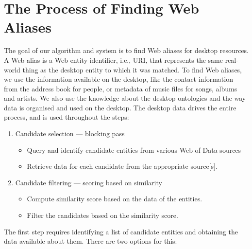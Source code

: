 \section{The Process of Finding Web Aliases}
\label{sec:process}

The goal of our algorithm and system is to find Web aliases for desktop resources. A Web alias is a Web entity identifier, i.e., URI, that represents the same real-world thing as the desktop entity to which it was matched. To find Web aliases, we use the information available on the desktop, like the contact information from the address book for people, or metadata of music files for songs, albums and artists. We also use the knowledge about the desktop ontologies and the way data is organised and used on the desktop. The desktop data drives the entire process, and is used throughout the steps:

\begin{enumerate}
 \item Candidate selection --- blocking pass
 \begin{itemize}
  \item Query and identify candidate entities from various Web of Data sources
  \item Retrieve data for each candidate from the appropriate source[s].
 \end{itemize}
 \item Candidate filtering --- scoring based on similarity
 \begin{itemize}
  \item Compute similarity score based on the data of the entities.
  \item Filter the candidates based on the similarity score.
 \end{itemize}
\end{enumerate}

The first step requires identifying a list of candidate entities and obtaining the data available about them. There are two options for this:

